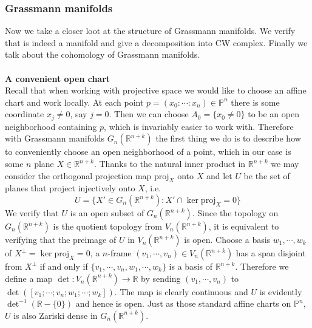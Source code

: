 \documentclass[12pt]{article}
\theoremstyle{plain}
\theoremstyle{definition}
\newcommand{\IP}{\mathbb{P}}
\newcommand{\IR}{\mathbb{R}}
\newcommand{\<}{\langle}
\renewcommand{\>}{\rangle}
\newcommand{\tG}{G_n(\IR^{n + k})}
\newcommand{\proj}{\mathrm{proj}}
\begin{document}
\subsubsection{Grassmann manifolds}
Now we take a closer loot at the structure of Grassmann manifolds. We verify that is indeed a manifold and give a decomposition into CW complex. Finally we talk about the cohomology of Grassmann manifolds. \\\\
\textbf{A convenient open chart}\\
Recall that when working with projective space we would like to choose an affine chart and work locally. At each point $p = (x_0 : \cdots : x_n) \in \IP^n$ there is some coordinate $x_j \neq 0$, say $j = 0$. Then we can choose $A_0 = \{x_0 \neq 0\}$ to be an open neighborhood containing $p$, which is invariably easier to work with. Therefore with Grassmann manifolds $\tG$ the first thing we do is to describe how to conveniently choose an open neighborhood of a point, which in our case is some $n$ plane $X \in \IR^{n + k}$. 
Thanks to the natural inner product in $\IR^{n + k}$ we may consider the orthogonal projection map $\proj_X$ onto $X$ and let $U$ be the set of planes that project injectively onto $X$, i.e. 
$$ U = \{ X' \in \tG : X' \cap \ker \proj_X = 0 \}$$
We verify that $U$ is an open subset of $\tG$. Since the topology on $\tG$ is the quotient topology from $V_n(\IR^{n + k})$, it is equivalent to verifying that the preimage of $U$ in $V_n(\IR^{n + k})$ is open. Choose a basis $w_1, \cdots, w_k$ of $X^\perp = \ker \proj_X = 0$, a $n$-frame $(v_1, \cdots, v_n) \in V_n(\IR^{n + k})$ has a span disjoint from $X^\perp$ if and only if $\{v_1, \cdots, v_n, w_1, \cdots, w_k\}$ is a basis of $\IR^{n + k }$. Therefore we define a map $\det : V_n(\IR^{n + k}) \to \IR $ by sending $(v_1, \cdots, v_n)$ to $\det([v_1; \cdots; v_n; w_1; \cdots; w_k])$. The map is clearly continuous and $U$ is evidently $\det^{-1}(\IR - \{0\})$ and hence is open. Just as those standard affine charts on $\IP^n$, $U$ is also Zariski dense in $\tG$. 
\end{document}
